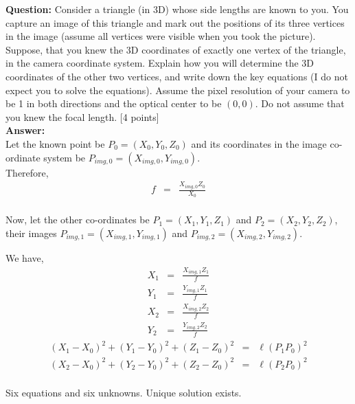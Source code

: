 \documentclass[11pt]{article}
\begin{document}
\setlength\parindent{0pt}

\maketitle

\textbf{Question:} Consider a triangle (in 3D) whose side lengths are known to you. You capture an image of this triangle and mark out the positions of its three vertices in the image (assume all vertices were visible when you took the picture). Suppose, that you knew the 3D coordinates of exactly one vertex of the triangle, in the camera coordinate system. Explain how you will determine the 3D coordinates of the other two vertices, and write down the key equations (I do not expect you to solve the equations). Assume the pixel resolution of your camera to be 1 in both directions and the optical center to be $(0,0)$. Do not assume that you knew the focal length. \textsf{[4 points]} \\

\textbf{Answer:} \\
Let the known point be $P_0 = (X_0, Y_0, Z_0)$ and its coordinates in the image co-ordinate system be $P_{img, 0} = (X_{img, 0}, Y_{img, 0})$. \\

Therefore,
\begin{eqnarray*}
f &=& \frac{X_{img, 0}{Z_0}}{X_0}\\
\end{eqnarray*}

Now, let the other co-ordinates be $P_1 = (X_1, Y_1, Z_1)$ and $P_2 = (X_2, Y_2, Z_2)$, their images $P_{img, 1} = (X_{img, 1}, Y_{img, 1})$ and $P_{img, 2} = (X_{img, 2}, Y_{img, 2})$.

We have,
\begin{eqnarray*}
X_{1} &=& \frac{X_{img, 1}{Z_1}}{f}\\
Y_{1} &=& \frac{Y_{img, 1}{Z_1}}{f}\\
X_{2} &=& \frac{X_{img, 2}{Z_2}}{f}\\
Y_{2} &=& \frac{Y_{img, 2}{Z_2}}{f}
\end{eqnarray*}
\begin{eqnarray*}
(X_{1} - X_{0})^2 + (Y_{1} - Y_{0})^2 + (Z_{1} - Z_{0})^2 &=& \ell(P_1P_0)^2\\
(X_{2} - X_{0})^2 + (Y_{2} - Y_{0})^2 + (Z_{2} - Z_{0})^2 &=& \ell(P_2P_0)^2\\
\end{eqnarray*}

Six equations and six unknowns. Unique solution exists.\\
\end{document}
